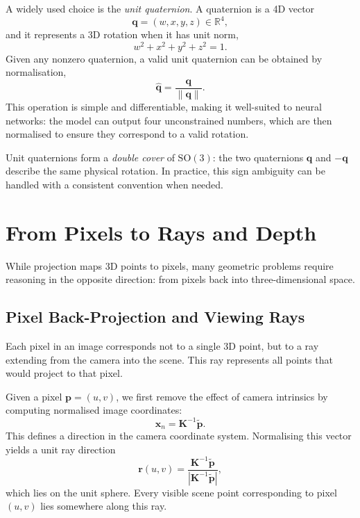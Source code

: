 A widely used choice is the \emph{unit quaternion}. A quaternion is a 4D vector
\begin{equation}
    \mathbf{q} = (w, x, y, z) \in \mathbb{R}^4,
\end{equation}
and it represents a 3D rotation when it has unit norm,
\begin{equation}
    w^2 + x^2 + y^2 + z^2 = 1.
\end{equation}
Given any nonzero quaternion, a valid unit quaternion can be obtained by normalisation,
\begin{equation}
    \hat{\mathbf{q}} = \frac{\mathbf{q}}{\|\mathbf{q}\|}.
\end{equation}
This operation is simple and differentiable, making it well-suited to neural networks: the model can output four unconstrained numbers, which are then normalised to ensure they correspond to a valid rotation.

Unit quaternions form a \emph{double cover} of $\mathrm{SO}(3)$: the two quaternions $\mathbf{q}$ and $-\mathbf{q}$ describe the same physical rotation. In practice, this sign ambiguity can be handled with a consistent convention when needed.

\section{From Pixels to Rays and Depth}
While projection maps 3D points to pixels, many geometric problems require reasoning in the opposite direction: from pixels back into three-dimensional space.

\subsection{Pixel Back-Projection and Viewing Rays}
Each pixel in an image corresponds not to a single 3D point, but to a ray extending from the camera into the scene. This ray represents all points that would project to that pixel.

Given a pixel $\mathbf{p} = (u,v)$, we first remove the effect of camera intrinsics by computing normalised image coordinates:
\begin{equation}
    \mathbf{x}_n = \mathbf{K}^{-1} \tilde{\mathbf{p}}.
\end{equation}
This defines a direction in the camera coordinate system. Normalising this vector yields a unit ray direction
\begin{equation}
    \mathbf{r}(u,v) = \frac{\mathbf{K}^{-1} \tilde{\mathbf{p}}}{|\mathbf{K}^{-1} \tilde{\mathbf{p}}|},
\end{equation}
which lies on the unit sphere. Every visible scene point corresponding to pixel $(u,v)$ lies somewhere along this ray.

